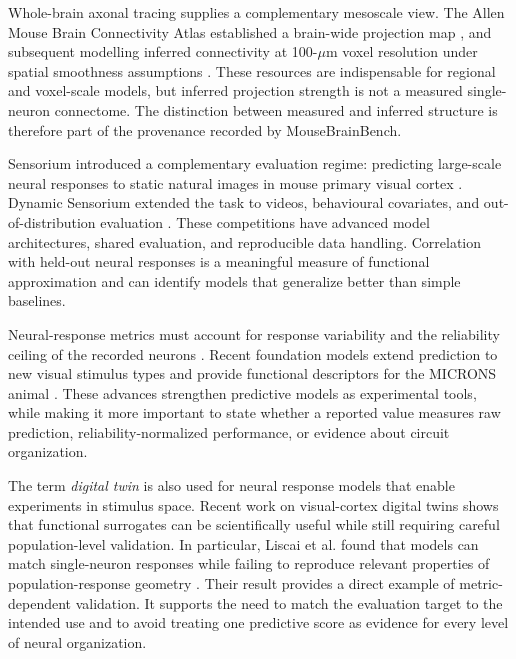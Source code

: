 \documentclass[a4paper,fleqn]{cas-sc}
\begin{document}
Whole-brain axonal tracing supplies a complementary mesoscale view. The Allen
Mouse Brain Connectivity Atlas established a brain-wide projection map
\citep{oh2014mesoscale}, and subsequent modelling inferred connectivity at
100-$\mu$m voxel resolution under spatial smoothness assumptions
\citep{knox2019connectome}. These resources are indispensable for regional and
voxel-scale models, but inferred projection strength is not a measured
single-neuron connectome. The distinction between measured and inferred
structure is therefore part of the provenance recorded by MouseBrainBench.

Sensorium introduced a complementary evaluation regime: predicting large-scale
neural responses to static natural images in mouse primary visual cortex
\citep{willeke2022sensorium}. Dynamic Sensorium extended the task to videos,
behavioural covariates, and out-of-distribution evaluation
\citep{turishcheva2023dynamic,turishcheva2024retrospective}. These competitions
have advanced model architectures, shared evaluation, and reproducible data
handling. Correlation with held-out neural responses is a meaningful measure of
functional approximation and can identify models that generalize better than
simple baselines.

Neural-response metrics must account for response variability and the
reliability ceiling of the recorded neurons \citep{schoppe2016performance}.
Recent foundation models extend prediction to new visual stimulus types and
provide functional descriptors for the MICRONS animal
\citep{wang2025foundation}. These advances strengthen predictive models as
experimental tools, while making it more important to state whether a reported
value measures raw prediction, reliability-normalized performance, or evidence
about circuit organization.

The term \emph{digital twin} is also used for neural response models that enable
experiments in stimulus space. Recent work on visual-cortex digital twins shows
that functional surrogates can be scientifically useful while still requiring
careful population-level validation. In particular, Liscai et al. found that
models can match single-neuron responses while failing to reproduce relevant
properties of
population-response geometry \citep{liscai2025population}. Their result provides
a direct example of metric-dependent validation. It supports the need to match
the evaluation target to the intended use and to avoid treating one predictive
score as evidence for every level of neural organization.
\end{document}
